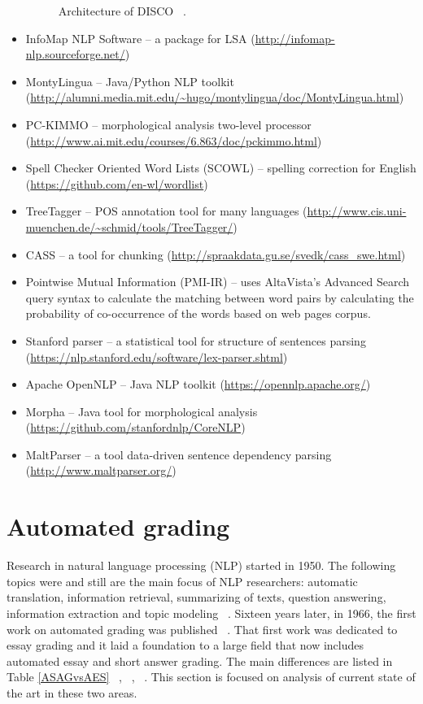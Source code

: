 \begin{itemize}
\begin{figure}[h!]
    \caption{ Architecture of DISCO ~\cite{DISCO}. }\label{fig:DISCO}
\end{figure}
\item InfoMap NLP Software -- a package for LSA (\url{http://infomap-nlp.sourceforge.net/})
\item MontyLingua -- Java/Python NLP toolkit (\url{http://alumni.media.mit.edu/~hugo/montylingua/doc/MontyLingua.html})
\item PC-KIMMO --  morphological analysis two-level processor  (\url{http://www.ai.mit.edu/courses/6.863/doc/pckimmo.html})
\item Spell Checker Oriented Word Lists (SCOWL) -- spelling correction for English (\url{https://github.com/en-wl/wordlist})
\item TreeTagger -- POS annotation tool for many languages (\url{http://www.cis.uni-muenchen.de/~schmid/tools/TreeTagger/})
\item CASS -- a tool for chunking (\url{http://spraakdata.gu.se/svedk/cass_swe.html})
\item Pointwise Mutual Information (PMI-IR) -- uses AltaVista's Advanced Search query
syntax to calculate the matching between word pairs by calculating the
probability of co-occurrence of the words based on web pages corpus.
\item Stanford parser -- a statistical tool for structure of sentences parsing (\url{https://nlp.stanford.edu/software/lex-parser.shtml})
\item Apache OpenNLP -- Java NLP toolkit (\url{https://opennlp.apache.org/})
\item Morpha -- Java tool for morphological analysis (\url{https://github.com/stanfordnlp/CoreNLP})
\item MaltParser -- a tool data-driven sentence dependency parsing (\url{http://www.maltparser.org/})
\end{itemize}


\section{\textbf{Automated grading}}

Research in natural language processing (NLP) started in 1950. The following topics were and still are the main focus of NLP researchers: automatic translation, information retrieval, summarizing of texts, question answering, information extraction and topic modeling  ~\cite{Cambria}. Sixteen years later, in 1966, the first work on automated grading was published ~\cite{Page}. That first work was dedicated to essay grading and it laid a foundation to a large field that now includes automated essay and short answer grading. The main differences are listed in Table \ref{ASAGvsAES} ~\cite{Burrows}, ~\cite{Hasanah}, ~\cite{Ziai}. This section is focused on analysis of current state of the art in these two areas.

